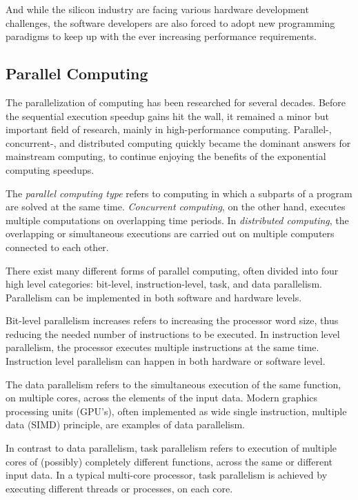 And while the silicon industry are facing various hardware development challenges, the software developers are also forced to adopt new programming paradigms to keep up with the ever increasing performance requirements.~\cite{Sutter:2005:FLiO}

\subsection{Parallel Computing}
\label{subsection:parallel-computing}

The parallelization of computing has been researched for several decades. Before the sequential execution speedup gains hit the wall, it remained a minor but important field of research, mainly in high-performance computing. Parallel-, concurrent-, and distributed computing quickly became the dominant answers for mainstream computing, to continue enjoying the benefits of the exponential computing speedups.

The \emph{parallel computing type} refers to computing in which a subparts of a program are solved at the same time. \emph{Concurrent computing}, on the other hand, executes multiple computations on overlapping time periods. In \emph{distributed computing}, the overlapping or simultaneous executions are carried out on multiple computers connected to each other.

There exist many different forms of parallel computing, often divided into four high level categories: bit-level, instruction-level, task, and data parallelism. Parallelism can be implemented in both software and hardware levels.~\cite{Culler:1997:PCA}

Bit-level parallelism increases refers to increasing the processor word size, thus reducing the needed number of instructions to be executed. In instruction level parallelism, the processor executes multiple instructions at the same time. Instruction level parallelism can happen in both hardware or software level.~\cite{Culler:1997:PCA}

The data parallelism refers to the simultaneous execution of the same function, on multiple cores, across the elements of the input data. Modern graphics processing units (GPU's), often implemented as wide single instruction, multiple data (SIMD) principle, are examples of data parallelism.~\cite{Culler:1997:PCA}

In contrast to data parallelism, task parallelism refers to execution of multiple cores of (possibly) completely different functions, across the same or different input data. In a typical multi-core processor, task parallelism is achieved by executing different threads or processes, on each core.~\cite{Culler:1997:PCA}

